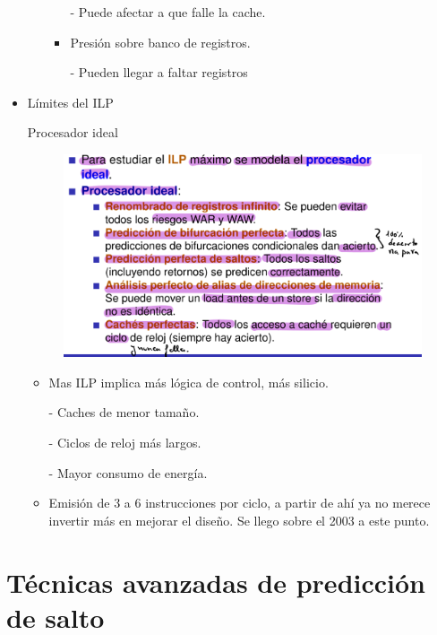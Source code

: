 \documentclass[12pt, twoside, openright]{report} %
\begin{document}
\begin{itemize}
\begin{itemize}
\begin{itemize}
    - Puede afectar a que falle la cache.
    \item Presión sobre banco de registros.
    
    - Pueden llegar a faltar registros
  \end{itemize}
      
\end{itemize}
    

\item Límites del ILP 

Procesador ideal

\begin{figure}[H]
	{\includegraphics[scale=.3]{Untitled 11.png}}
\end{figure}

  \begin{itemize}
  \item Mas ILP implica más lógica de control, más silicio.
       
        - Caches de menor tamaño.

        - Ciclos de reloj más largos.

        - Mayor consumo de energía.
  \item Emisión de 3 a 6 instrucciones por ciclo, a partir de ahí ya no merece invertir más en mejorar el diseño. Se llego sobre el 2003 a este punto.
  \end{itemize}
\end{itemize}




\section{Técnicas avanzadas de predicción de salto}
\end{document}
